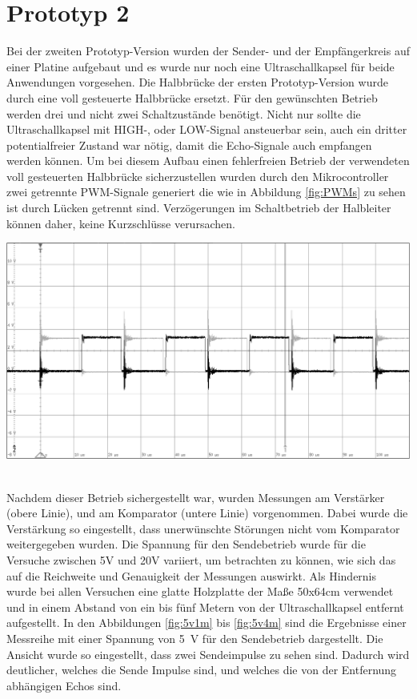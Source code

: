 \section{Prototyp 2}
Bei der zweiten Prototyp-Version wurden der Sender- und der Empfängerkreis auf einer Platine aufgebaut und es wurde nur noch eine Ultraschallkapsel für beide Anwendungen vorgesehen. Die Halbbrücke der ersten Prototyp-Version wurde durch eine voll gesteuerte Halbbrücke ersetzt. Für den gewünschten Betrieb werden drei und nicht zwei Schaltzustände benötigt. Nicht nur sollte die Ultraschallkapsel mit HIGH-, oder LOW-Signal ansteuerbar sein, auch ein dritter potentialfreier Zustand war nötig, damit die Echo-Signale auch empfangen werden können. Um bei diesem Aufbau einen fehlerfreien Betrieb der verwendeten voll gesteuerten Halbbrücke sicherzustellen wurden durch den Mikrocontroller zwei getrennte PWM-Signale generiert die wie in Abbildung \ref{fig:PWMs} zu sehen ist durch Lücken getrennt sind. Verzögerungen im Schaltbetrieb der Halbleiter können daher, keine Kurzschlüsse verursachen.\\
\begin{minipage}{0.75\textwidth}
\includegraphics[width=1\textwidth%
]{Abbildungen/MessungenP2/Zwei_PWMs_von_der_CPU.PNG}
\label{fig:PWMs}
\end{minipage}\\
Nachdem dieser Betrieb sichergestellt war, wurden Messungen am Verstärker (obere Linie), und am Komparator (untere Linie) vorgenommen. Dabei wurde die Verstärkung so eingestellt, dass unerwünschte Störungen nicht vom Komparator weitergegeben wurden. Die Spannung für den Sendebetrieb wurde für die Versuche zwischen 5V und 20V variiert, um betrachten zu können, wie sich das auf die Reichweite und Genauigkeit der Messungen auswirkt. Als Hindernis wurde bei allen Versuchen eine glatte Holzplatte der Maße 50x64cm verwendet und in einem Abstand von ein bis fünf Metern von der Ultraschallkapsel entfernt aufgestellt. In den Abbildungen \ref{fig:5v1m} bis \ref{fig:5v4m} sind die Ergebnisse einer Messreihe mit einer Spannung von 5~V für den Sendebetrieb dargestellt. Die Ansicht wurde so eingestellt, dass zwei Sendeimpulse zu sehen sind. Dadurch wird deutlicher, welches die Sende Impulse sind, und welches die von der Entfernung abhängigen Echos sind.\\
